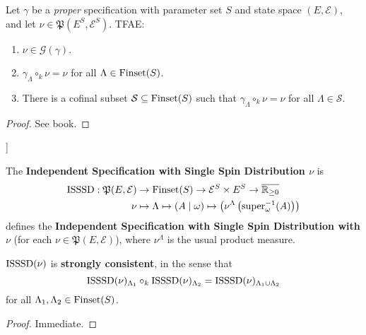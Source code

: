\begin{lemma}
    \label{lem:gibbs-measure-char}

    Let $\gamma$ be a {\it proper} specification with parameter set $S$ and state space $(E, \mathcal{E})$, and let $\nu\in\mathfrak{P}(E^S, \mathcal{E}^S)$. TFAE:
    \begin{enumerate}
        \item $\nu\in\mathcal{G}(\gamma)$.
        \item $\gamma_\Lambda\circ_k\nu=\nu$ for all $\Lambda\in\operatorname{Finset}(S)$.
        \item There is a cofinal subset $\mathcal{S}\subseteq\operatorname{Finset}(S)$ such that $\gamma_\Lambda\circ_k\nu=\nu$ for all $\Lambda\in\mathcal{S}$.
    \end{enumerate}
\end{lemma}
\begin{proof}

  See book.
\end{proof}

\begin{definition}[Independent Specification with Single Spin Distribution [ISSSD]]
    \label{def:ISSSD}

    The \textbf{Independent Specification with Single Spin Distribution $\nu$} is
    \begin{align}
        \operatorname{ISSSD}:\mathfrak{P}(E, \mathcal{E})&\to\operatorname{Finset}(S)\to\mathcal{E}^S\times E^S\to\overline{\mathbb{R}_{\geq0}}\\
        \nu&\mapsto\Lambda\mapsto(A\mid\omega)\mapsto\left(\nu^\Lambda\left(\text{super}_\omega^{-1}(A)\right)\right)
    \end{align}
    defines the \textbf{Independent Specification with Single Spin Distribution with $\nu$} (for each $\nu\in\mathfrak{P}(E, \mathcal{E})$), where $\nu^\Lambda$ is the usual product measure.
\end{definition}

\begin{lemma}
    \label{lem:isssd-strong-consistency}
    \leanok

    $\operatorname{ISSSD}(\nu)$ is {\bf strongly consistent}, in the sense that
    $$\operatorname{ISSSD}(\nu)_{\Lambda_1} \circ_k \operatorname{ISSSD}(\nu)_{\Lambda_2} = \operatorname{ISSSD}(\nu)_{\Lambda_1 \cup \Lambda_2}$$
    for all $\Lambda_1, \Lambda_2 \in \operatorname{Finset}(S)$.
\end{lemma}
\begin{proof}

  Immediate.
\end{proof}

